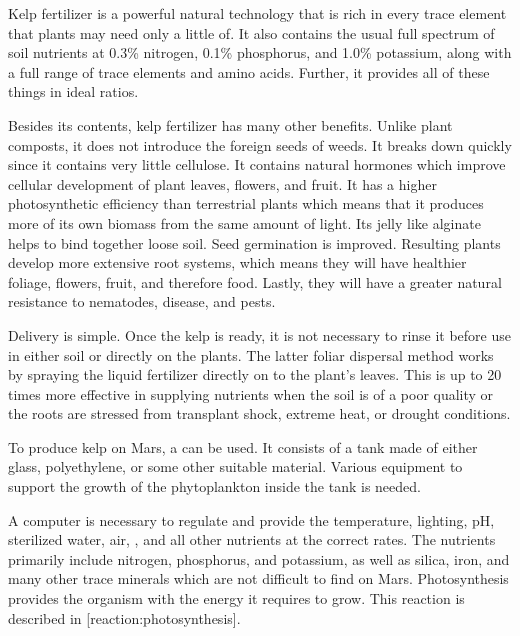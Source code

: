 Kelp fertilizer is a powerful natural technology that is rich in every trace element that plants may need only a little of. It also contains the usual full spectrum of soil nutrients at 0.3\% nitrogen, 0.1\% phosphorus, and 1.0\% potassium, along with a full range of trace elements and amino acids. Further, it provides all of these things in ideal ratios.

Besides its contents, kelp fertilizer has many other benefits. Unlike plant composts, it does not introduce the foreign seeds of weeds. It breaks down quickly since it contains very little cellulose. It contains natural hormones which improve cellular development of plant leaves, flowers, and fruit. It has a higher photosynthetic efficiency than terrestrial plants which means that it produces more of its own biomass from the same amount of light. Its jelly like alginate helps to bind together loose soil. Seed germination is improved. Resulting plants develop more extensive root systems, which means they will have healthier foliage, flowers, fruit, and therefore food. Lastly, they will have a greater natural resistance to nematodes, disease, and pests.

Delivery is simple. Once the kelp is ready, it is not necessary to rinse it before use in either soil or directly on the plants. The latter foliar dispersal method works by spraying the liquid fertilizer directly on to the plant's leaves. This is up to 20 times more effective in supplying nutrients when the soil is of a poor quality or the roots are stressed from transplant shock, extreme heat, or drought conditions.

To produce kelp on Mars, a  can be used. It consists of a tank made of either glass, polyethylene, or some other suitable material. Various equipment to support the growth of the phytoplankton inside the tank is needed.

A computer is necessary to regulate and provide the temperature, lighting, pH, sterilized water, air, , and all other nutrients at the correct rates. The nutrients primarily include nitrogen, phosphorus, and potassium, as well as silica, iron, and many other trace minerals which are not difficult to find on Mars. Photosynthesis provides the organism with the energy it requires to grow. This reaction is described in [reaction:photosynthesis].

\startformula
{}
\stopformula

